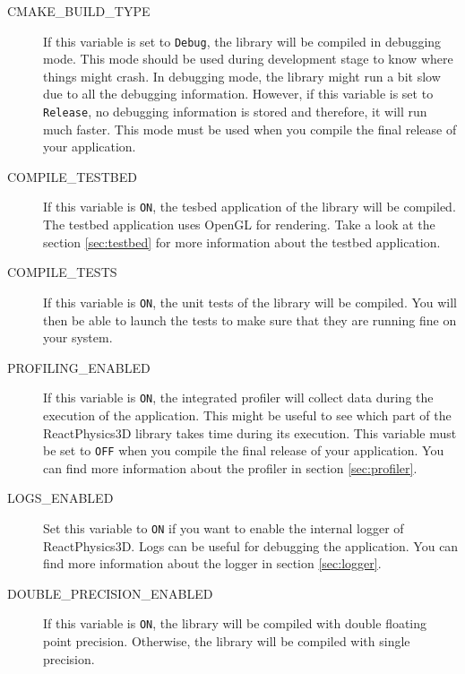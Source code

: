 \documentclass[a4paper,12pt]{article}
\begin{document}
       \begin{description}
         \item[CMAKE\_BUILD\_TYPE] If this variable is set to \texttt{Debug}, the library will be compiled in debugging mode.
                                                    This mode should be used during development stage to know where things might crash.
                                                    In debugging mode, the library might run a bit slow due to all the debugging information.
                                                    However, if this variable is set to \texttt{Release}, no debugging information is stored
                                                    and therefore, it will run much faster. This mode must be used when you compile the final
                                                    release of your application.

         \item[COMPILE\_TESTBED] If this variable is \texttt{ON}, the tesbed application of the library will be compiled.
                                                         The testbed application uses OpenGL for rendering.
                                                         Take a look at the section \ref{sec:testbed} for more information about the testbed application.

         \item[COMPILE\_TESTS] If this variable is \texttt{ON}, the unit tests of the library will be compiled. You will then
                                             be able to launch the tests to make sure that they are running fine on your system.

          \item[PROFILING\_ENABLED] If this variable is \texttt{ON}, the integrated profiler will collect data during the execution of the application.
                                                      This might be useful to see which part of the ReactPhysics3D
                                                      library takes time during its execution. This variable must be set to \texttt{OFF} when you compile
						      the final release of your application. You can find more information about the profiler in section \ref{sec:profiler}.

         \item[LOGS\_ENABLED] Set this variable to \texttt{ON} if you want to enable the internal logger of ReactPhysics3D. Logs can be useful for debugging the application.
		              You can find more information about the logger in section \ref{sec:logger}.

          \item[DOUBLE\_PRECISION\_ENABLED] If this variable is \texttt{ON}, the library will be compiled with double floating point precision.
                                                                    Otherwise, the library will be compiled with single precision.
       \end{description}
\end{document}
